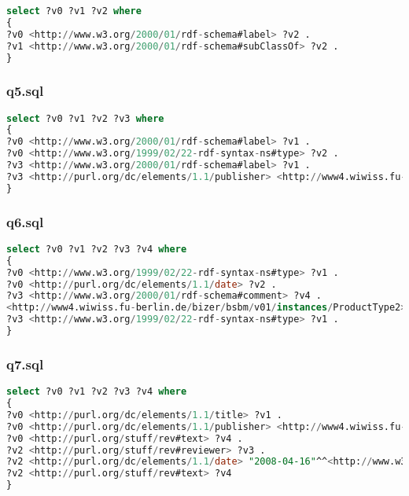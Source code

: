 \documentclass[titlepage, a4paper, 12pt] {article}
\begin{document}
\begin{lstlisting}[language=SQL] 
select ?v0 ?v1 ?v2 where
{
?v0 <http://www.w3.org/2000/01/rdf-schema#label> ?v2 .
?v1 <http://www.w3.org/2000/01/rdf-schema#subClassOf> ?v2 .
}
\end{lstlisting}

\subsubsection{q5.sql}

\begin{lstlisting}[language=SQL] 
select ?v0 ?v1 ?v2 ?v3 where
{
?v0 <http://www.w3.org/2000/01/rdf-schema#label> ?v1 .
?v0 <http://www.w3.org/1999/02/22-rdf-syntax-ns#type> ?v2 .
?v3 <http://www.w3.org/2000/01/rdf-schema#label> ?v1 .
?v3 <http://purl.org/dc/elements/1.1/publisher> <http://www4.wiwiss.fu-berlin.de/bizer/bsbm/v01/instances/StandardizationInstitution1> .
}
\end{lstlisting}

\subsubsection{q6.sql}

\begin{lstlisting}[language=SQL] 
select ?v0 ?v1 ?v2 ?v3 ?v4 where
{
?v0 <http://www.w3.org/1999/02/22-rdf-syntax-ns#type> ?v1 .
?v0 <http://purl.org/dc/elements/1.1/date> ?v2 .
?v3 <http://www.w3.org/2000/01/rdf-schema#comment> ?v4 .
<http://www4.wiwiss.fu-berlin.de/bizer/bsbm/v01/instances/ProductType2> <http://www.w3.org/2000/01/rdf-schema#comment> ?v4 .
?v3 <http://www.w3.org/1999/02/22-rdf-syntax-ns#type> ?v1 .
}
\end{lstlisting}

\subsubsection{q7.sql}

\begin{lstlisting}[language=SQL] 
select ?v0 ?v1 ?v2 ?v3 ?v4 where
{
?v0 <http://purl.org/dc/elements/1.1/title> ?v1 .
?v0 <http://purl.org/dc/elements/1.1/publisher> <http://www4.wiwiss.fu-berlin.de/bizer/bsbm/v01/instances/dataFromRatingSite11/RatingSite11> .
?v0 <http://purl.org/stuff/rev#text> ?v4 .
?v2 <http://purl.org/stuff/rev#reviewer> ?v3 .
?v2 <http://purl.org/dc/elements/1.1/date> "2008-04-16"^^<http://www.w3.org/2001/XMLSchema#date> .
?v2 <http://purl.org/stuff/rev#text> ?v4
}
\end{lstlisting}
\end{document}
